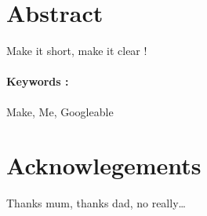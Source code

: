 \vfill

\cleardoublepage
\pagestyle{headings}
%
\clearpage
\section*{Abstract}
Make it short, make it clear !
\blindtext
\paragraph{Keywords :} Make, Me, Googleable
\clearpage
\section*{Acknowlegements}
Thanks mum, thanks dad, no really… 
\blindtext

\cleardoublepage
\tableofcontents

